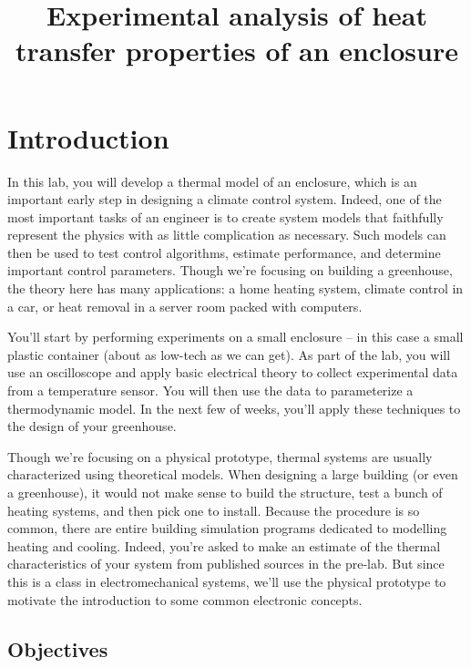 \documentclass[11pt]{article} %
\title{Experimental analysis of heat transfer properties of an enclosure}
\author{}
\date{} %
\begin{document}
\maketitle


\section{Introduction}

In this lab, you will develop a thermal model of an enclosure, which is an important early step in designing a climate control system. Indeed, one of the most important tasks of an engineer is to create system models that faithfully represent the physics with as little complication as necessary. Such models can then be used to test control algorithms, estimate performance, and determine important control parameters. Though we’re focusing on building a greenhouse, the theory here has many applications: a home heating system, climate control in a car, or heat removal in a server room packed with computers.

You’ll start by performing experiments on a small enclosure -- in this case a small plastic container (about as low-tech as we can get). As part of the lab, you will use an oscilloscope and apply basic electrical theory to collect experimental data from a temperature sensor. You will then use the data to parameterize a thermodynamic model. In the next few of weeks, you’ll apply these techniques to the design of your greenhouse.

Though we’re focusing on a physical prototype, thermal systems are usually characterized using theoretical models. When designing a large building (or even a greenhouse), it would not make sense to build the structure, test a bunch of heating systems, and then pick one to install. Because the procedure is so common, there are entire building simulation programs dedicated to modelling heating and cooling. Indeed, you’re asked to make an estimate of the thermal characteristics of your system from published sources in the pre-lab. But since this is a class in electromechanical systems, we’ll use the physical prototype to motivate the introduction to some common electronic concepts.

\subsection*{Objectives}
\end{document}
